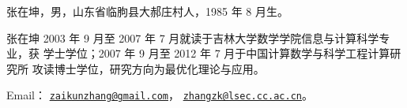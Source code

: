 
\begin{resume}
    张在坤，男，山东省临朐县大郝庄村人，1985 年 8 月生。

张在坤 2003 年 9 月至 2007 年 7 月就读于吉林大学数学学院信息与计算科学专业，获
学士学位；2007 年 9 月至 2012 年 7 月于中国计算数学与科学工程计算研究所
攻读博士学位，研究方向为最优化理论与应用。

Email：
\href{mailto:zaikunzhang@gmail.com}{\texttt{zaikunzhang@gmail.com}}，
\href{mailto:zhangzk@lsec.cc.ac.cn}{\texttt{zhangzk@lsec.cc.ac.cn}}。
\end{resume}
